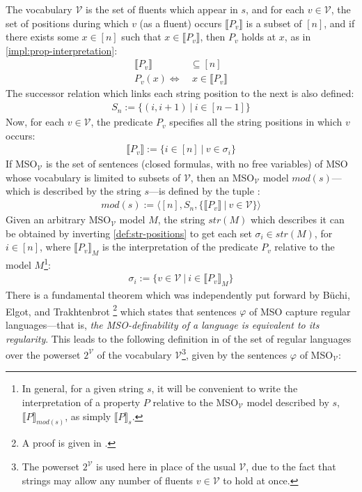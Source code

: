 \documentclass[a4paper,12pt,leqno,twoside]{article}
\newcommand{\V}{\mathcal{V}}
\renewcommand{\phi}{\varphi}
\begin{document}
The vocabulary $\V$ is the set of fluents which appear in $s$, and for each $v \in \V$, the set of positions during which $v$ (as a fluent) occurs $\llbracket P_v \rrbracket$ is a subset of $[n]$, and if there exists some $x \in [n]$ such that $x \in \llbracket P_v \rrbracket$, then $P_v$ holds at $x$, as in \cref{impl:prop-interpretation}:
\begin{align}
	\llbracket P_v \rrbracket &\subseteq [n]\\
	P_v(x) \Longleftrightarrow& ~x \in \llbracket P_v \rrbracket
\end{align}
The successor relation which links each string position to the next is also defined:
\begin{align}
	S_n := \{(i, i+1) ~|~ i \in [n - 1]\}
\end{align}
Now, for each $v \in \V$, the predicate $P_v$ specifies all the string positions in which $v$ occurs:
\begin{align}\label{def:str-positions}
	\llbracket P_v \rrbracket := \{i \in [n] ~|~ v \in \sigma_i\}
\end{align}
If MSO$_{\V}$ is the set of sentences (closed formulas, with no free variables) of MSO whose vocabulary is limited to subsets of $\V$, then an MSO$_{\V}$ model $mod(s)$---which is described by the string $s$---is defined by the tuple \citep{fernando2016regular}:
\begin{align}
	mod(s) := \langle [n], S_n, \{\llbracket P_v \rrbracket ~|~ v \in \V\} \rangle
\end{align}
Given an arbitrary MSO$_{\V}$ model $M$, the string $str(M)$ which describes it can be obtained by inverting \cref{def:str-positions} to get each set $\sigma_i \in str(M)$, for $i \in [n]$, where $\llbracket P_v \rrbracket_M$ is the interpretation of the predicate $P_v$ relative to the model $M$\footnote{In general, for a given string $s$, it will be convenient to write the interpretation of a property $P$ relative to the MSO$_{\V}$ model described by $s$, $\llbracket P \rrbracket_{mod(s)}$, as simply $\llbracket P \rrbracket_s$.}:
\begin{align}
	\sigma_i := \{v \in \V ~|~ i \in \llbracket P_v \rrbracket_M \}
\end{align}
There is a fundamental theorem which was independently put forward by B\"{u}chi, Elgot, and Trakhtenbrot \cite[p. 30]{fernando2016regular}\footnote{A proof is given in \citet[p.124, Theorem 7.21]{Libkin2004}.} which states that sentences $\phi$ of MSO capture regular languages---that is, \textit{the MSO-definability of a language is equivalent to its regularity}. This leads to the following definition in \citet[p. 35]{Fernando2018} of the set of regular languages over the powerset $2^{\V}$ of the vocabulary $\V$\footnote{The powerset $2^{\V}$ is used here in place of the usual $\V$, due to the fact that strings may allow any number of fluents $v \in \V$ to hold at once.}, given by the sentences $\phi$ of MSO$_{\V}$:
\end{document}
